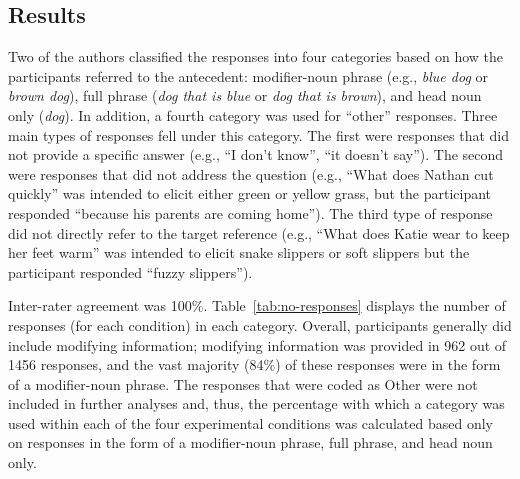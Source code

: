 \documentclass[output=paper]{langsci/langscibook}
\begin{document}
\subsection{Results}

Two of the authors classified the responses into four categories based
on how the participants referred to the antecedent: modifier-noun
phrase (e.g., \textit{blue dog} or \textit{brown dog}), full phrase
(\textit{dog that is blue} or \textit{dog that is brown}), and head
noun only (\textit{dog}). In addition, a fourth category was used for
“other” responses. Three main types of responses fell under this
category.  The first were responses that did not provide a specific
answer (e.g., “I don’t know”, “it doesn’t say”). The second were
responses that did not address the question (e.g.,
“What does Nathan cut quickly” was intended to elicit either green or
yellow grass, but the participant responded “because his parents are
coming home”).
The third type of response did not directly refer to the target
reference (e.g.,
“What does Katie wear to keep her feet warm” was intended to elicit
snake slippers or soft slippers but the participant responded “fuzzy
slippers”).

Inter-rater agreement was 100\%. Table~\ref{tab:no-responses} displays
the number of responses (for each condition) in each
category. Overall, participants generally did include modifying
information; modifying information was provided in 962 out of 1456
responses, and the vast majority (84\%) of these responses were in the
form of a modifier-noun phrase. The responses that were coded as Other
were not included in further analyses and, thus, the percentage with
which a category was used within each of the four experimental
conditions was calculated based only on responses in the form of a
modifier-noun phrase, full phrase, and head noun only.
\end{document}
